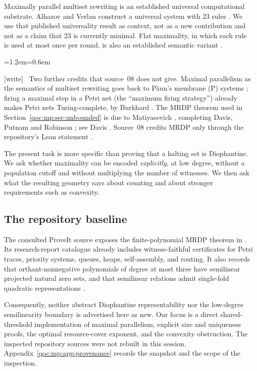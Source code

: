 \documentclass[11pt,letterpaper]{article}
\theoremstyle{definition}
\theoremstyle{remark}
\newcommand{\wtag}{\textup{[write]}}
\newenvironment{writenote}{\par\smallskip\begin{list}{}{\leftmargin=1.2em\rightmargin=0.6em}\item[]\small\wtag\ }{\end{list}\smallskip}
\begin{document}
Maximally parallel multiset rewriting is an established universal
computational substrate. Alhazov and Verlan construct a universal system
with 23 rules \cite{mp:alhazov}. We use that published universality result as
context, not as a new contribution and not as a claim that 23 is currently
minimal. Flat maximality, in which each rule is used at most once per
round, is also an established semantic variant \cite{mp:flat}.

\begin{writenote}
Two further credits that source~08 does not give. Maximal parallelism as the semantics of multiset rewriting goes back to P\u{a}un's membrane (P) systems \cite{w:paun}; firing a maximal step in a Petri net (the ``maximum firing strategy'') already makes Petri nets Turing-complete, by Burkhard \cite{w:burkhard}. The MRDP theorem used in Section~\ref{qoc:mp:sec:unbounded} is due to Matiyasevich \cite{w:matiyasevich70}, completing Davis, Putnam and Robinson \cite{w:dpr61}; see Davis \cite{w:davis73}. Source~08 credits MRDP only through the repository's Lean statement \cite{mp:repo-mrdp}.
\end{writenote}

The present task is more specific than proving that a halting set is
Diophantine. We ask whether maximality can be encoded \emph{explicitly},
at low degree, without a population cutoff and without multiplying the
number of witnesses. We then ask what the resulting geometry says about
counting and about stronger requirements such as convexity.

\subsection{The repository baseline}
The consulted ProveIt source exposes the finite-polynomial MRDP theorem in
\cite{mp:repo-mrdp}. Its research-report catalogue already includes
witness-faithful certificates for Petri traces, priority systems, queues,
heaps, self-assembly, and routing. It also records that orthant-nonnegative
polynomials of degree at most three have semilinear projected natural zero
sets, and that semilinear relations admit single-fold quadratic
representations \cite{mp:repo-canonical}.

Consequently, neither abstract Diophantine representability nor the
low-degree semilinearity boundary is advertised here as new. Our focus is
a direct shared-threshold implementation of maximal parallelism, explicit
size and uniqueness proofs, the optimal resource-cover exponent, and the
convexity obstruction. The inspected repository sources were not rebuilt
in this session. Appendix~\ref{qoc:mp:app:provenance} records the snapshot and the
scope of the inspection.
\end{document}
